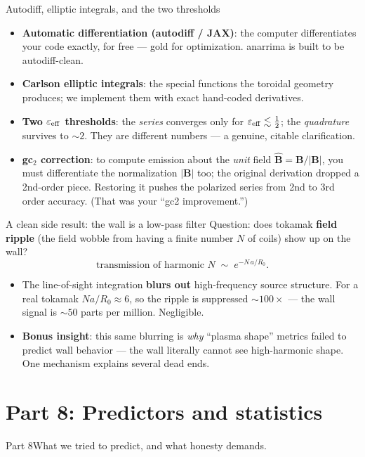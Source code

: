 \documentclass[11pt,aspectratio=169]{beamer}
\newcommand{\key}[1]{\textcolor{key}{\textbf{#1}}}
\newcommand{\bhat}{\hat{\mathbf{B}}}
\begin{document}
\begin{frame}{Autodiff, elliptic integrals, and the two thresholds}
\begin{itemize}
\item \key{Automatic differentiation (autodiff / JAX)}: the computer differentiates your code
exactly, for free --- gold for optimization. anarrima is built to be autodiff-clean.
\item \key{Carlson elliptic integrals}: the special functions the toroidal geometry produces;
we implement them with exact hand-coded derivatives.
\item \key{Two $\varepsilon_{\rm eff}$ thresholds}: the \emph{series} converges only for
$\varepsilon_{\rm eff}\lesssim \tfrac12$; the \emph{quadrature} survives to $\sim\!2$. They
are different numbers --- a genuine, citable clarification.
\item \key{gc$_2$ correction}: to compute emission about the \emph{unit} field $\bhat=\mathbf
B/|\mathbf B|$, you must differentiate the normalization $|\mathbf B|$ too; the original
derivation dropped a 2nd-order piece. Restoring it pushes the polarized series from 2nd to
3rd order accuracy. (That was your ``gc2 improvement.'')
\end{itemize}
\end{frame}

\begin{frame}{A clean side result: the wall is a low-pass filter}
Question: does tokamak \key{field ripple} (the field wobble from having a finite number
$N$ of coils) show up on the wall?
\[ \text{transmission of harmonic }N \;\sim\; e^{-N\,a/R_0}. \]
\begin{itemize}
\item The line-of-sight integration \key{blurs out} high-frequency source structure. For a
real tokamak $N a/R_0\approx 6$, so the ripple is suppressed $\sim\!100\times$ --- the wall
signal is $\sim\!50$ parts per million. Negligible.
\item \key{Bonus insight}: this same blurring is \emph{why} ``plasma shape'' metrics failed
to predict wall behavior --- the wall literally cannot see high-harmonic shape. One mechanism
explains several dead ends.
\end{itemize}
\end{frame}

\section{Part 8: Predictors and statistics}
\begin{frame}{Part 8}\Large What we tried to predict, and what honesty demands.\end{frame}
\end{document}
